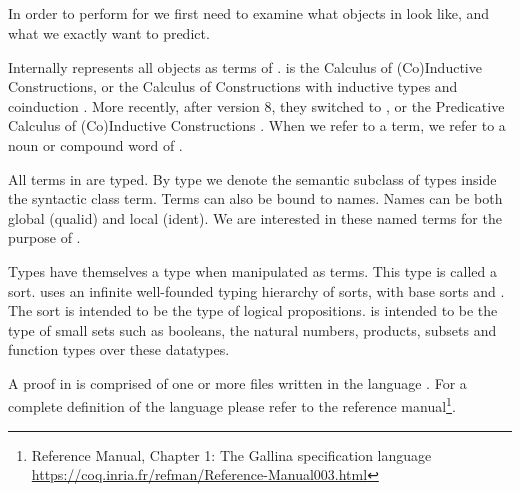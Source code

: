 
\subsection{\coq}

In order to perform \premiseselection for \coq we first need to examine what objects in \coq look like, and what we exactly want to predict.

Internally \coq represents all objects as terms  of \cic {}.
\cic is the Calculus of (Co)Inductive Constructions,
or the Calculus of Constructions \cite{coquand1988calculus} with inductive types and coinduction \cite{huet1987induction} \cite{coquand1990inductively}.
More recently, after \coq version 8, they switched to \pcic {}, or the Predicative Calculus of (Co)Inductive Constructions \cite{bertot2013interactive}.
When we refer to a term, we refer to a noun or compound word of \pcic.

All terms in \coq are typed.
By type  we denote the semantic subclass of types inside the syntactic class term.
Terms can also be bound to names.
Names can be both global (qualid) and local (ident).
We are interested in these named terms for the purpose of \premiseselection.

Types have themselves a type when manipulated as terms.
This type is called a sort. 
\pcic uses an infinite well-founded typing hierarchy of sorts, with base sorts \sortprop and \sortset.
The sort \sortprop is intended to be the type of logical propositions.
\sortset is intended to be the type of small sets such as booleans, the natural numbers, products, subsets and function types over these datatypes.

A proof in \coq is comprised of one or more files written in the \gallina language \cite{huet1992gallina}.
For a complete definition of the \gallina language please refer to the \coq reference manual\footnote{\coq Reference Manual, Chapter 1: The Gallina specification language\\ \url{https://coq.inria.fr/refman/Reference-Manual003.html}}.


